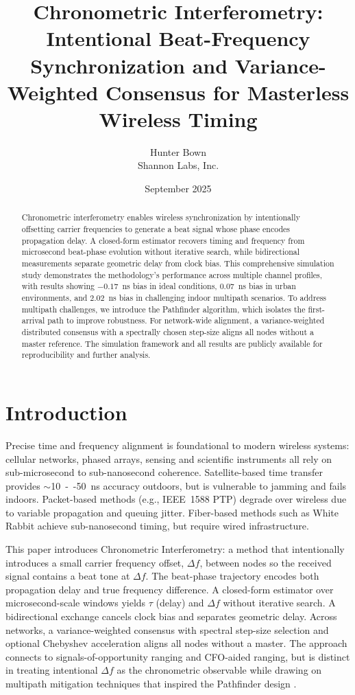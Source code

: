 \documentclass[10pt]{article}
\title{Chronometric Interferometry: Intentional Beat-Frequency Synchronization and Variance-Weighted Consensus for Masterless Wireless Timing}
\author{Hunter Bown\\Shannon Labs, Inc.}
\date{September 2025}
\begin{document}
\maketitle

\begin{abstract}
Chronometric interferometry enables wireless synchronization by intentionally offsetting carrier frequencies to generate a beat signal whose phase encodes propagation delay. A closed-form estimator recovers timing and frequency from microsecond beat-phase evolution without iterative search, while bidirectional measurements separate geometric delay from clock bias. This comprehensive simulation study demonstrates the methodology's performance across multiple channel profiles, with results showing $-0.17$~ns bias in ideal conditions, $0.07$~ns bias in urban environments, and $2.02$~ns bias in challenging indoor multipath scenarios. To address multipath challenges, we introduce the Pathfinder algorithm, which isolates the first-arrival path to improve robustness. For network-wide alignment, a variance-weighted distributed consensus with a spectrally chosen step-size aligns all nodes without a master reference. The simulation framework and all results are publicly available for reproducibility and further analysis.
\end{abstract}


\section{Introduction}
Precise time and frequency alignment is foundational to modern wireless systems: cellular networks, phased arrays, sensing and scientific instruments all rely on sub-microsecond to sub-nanosecond coherence. Satellite-based time transfer provides \(\sim\)\SI{10}{--}\SI{50}{ns} accuracy outdoors, but is vulnerable to jamming and fails indoors. Packet-based methods (e.g., IEEE~1588 PTP) degrade over wireless due to variable propagation and queuing jitter. Fiber-based methods such as White Rabbit achieve sub-nanosecond timing, but require wired infrastructure.

This paper introduces Chronometric Interferometry: a method that intentionally introduces a small carrier frequency offset, \(\Delta f\), between nodes so the received signal contains a beat tone at \(\Delta f\). The beat-phase trajectory encodes both propagation delay and true frequency difference. A closed-form estimator over microsecond-scale windows yields \(\tau\) (delay) and \(\Delta f\) without iterative search. A bidirectional exchange cancels clock bias and separates geometric delay. Across networks, a variance-weighted consensus with spectral step-size selection and optional Chebyshev acceleration aligns all nodes without a master. The approach connects to signals-of-opportunity ranging and CFO-aided ranging, but is distinct in treating intentional \(\Delta f\) as the chronometric observable \citep{Amin2010SignalsOfOpportunity,Hottinen2009JointTOACFO} while drawing on multipath mitigation techniques that inspired the Pathfinder design \citep{Groves2011Multipath}.
\end{document}
